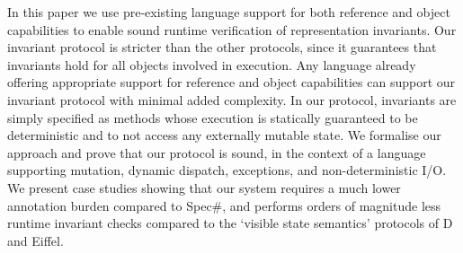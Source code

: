 In this paper we use pre-existing language support for both reference and object capabilities to enable sound runtime verification of representation invariants.
Our invariant protocol is stricter than the other  protocols, since it guarantees that invariants hold for all objects involved in execution.
Any language already offering appropriate support for reference and object capabilities can support our invariant protocol with minimal added complexity.
In our protocol, invariants are simply specified as methods whose execution is statically guaranteed to be deterministic and to not access any externally mutable state.
We formalise our approach and prove that our protocol is sound, in the context of a language supporting mutation, dynamic dispatch, exceptions, and non-deterministic I/O.
We present case studies showing that our system requires a much lower annotation burden compared to Spec\#, and performs orders of magnitude less runtime invariant checks compared to the `visible state semantics' protocols of D and Eiffel.

